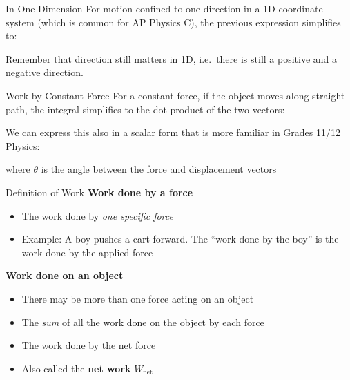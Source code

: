 \documentclass[12pt,compress,aspectratio=169]{beamer}
\begin{document}
\begin{frame}{In One Dimension}
  For motion confined to one direction in a 1D coordinate system (which is
  common for AP Physics C), the previous expression simplifies to:
  

  Remember that direction still matters in 1D, i.e.\ there is still a positive
  and a negative direction.
\end{frame}



\begin{frame}{Work by Constant Force}
  For a constant force, if the object moves along straight path, the integral
  simplifies to the dot product of the two vectors:


  We can express this also in a scalar form that is more familiar in Grades
  11/12 Physics:


  where $\theta$ is the angle between the force and displacement vectors
\end{frame}



\begin{frame}{Definition of Work}
  \textbf{Work done by a force}
  \begin{itemize}
  \item The work done by \emph{one specific force}
  \item Example: A boy pushes a cart forward. The ``work done by the boy'' is
    the work done by the applied force
  \end{itemize}

  \vspace{.15in}\textbf{Work done on an object}
  \begin{itemize}
  \item There may be more than one force acting on an object
  \item The \emph{sum} of all the work done on the object by each force
  \item The work done by the net force
  \item Also called the \textbf{net work} $W_\text{net}$
  \end{itemize}
\end{frame}
\end{document}
